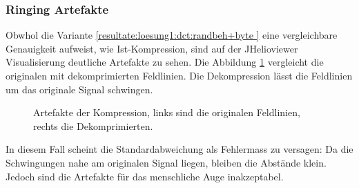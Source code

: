 \subsubsection{Ringing Artefakte}\label{resultate:loesung1:ringing}
Obwhol die Variante \ref{resultate:loesung1:dct:randbeh+byte } eine vergleichbare Genauigkeit aufweist, wie Ist-Kompression, sind auf der JHelioviewer Visualisierung deutliche Artefakte zu sehen. Die Abbildung \ref{resultate:loesung1:dct:randbehandlung:jvhartefakte} vergleicht die originalen mit dekomprimierten Feldlinien. Die Dekompression lässt die Feldlinien um das originale Signal schwingen.
\begin{figure}[!htbp]
	\center
	\caption{Artefakte der Kompression, links sind die originalen Feldlinien, rechts die Dekomprimierten.}
	\label{resultate:loesung1:dct:randbehandlung:jvhartefakte}
\end{figure} 
In diesem Fall scheint die Standardabweichung als Fehlermass zu versagen: Da die Schwingungen nahe am originalen Signal liegen, bleiben die Abstände klein. Jedoch sind die Artefakte für das menschliche Auge inakzeptabel.\\
